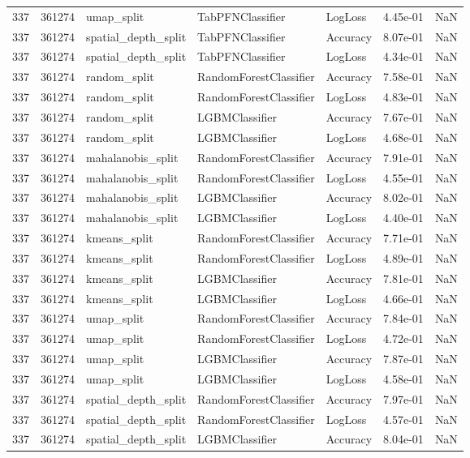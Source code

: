 \begin{tabular}{rrlllrr}
337 & 361274 & umap\_split & TabPFNClassifier & LogLoss & 4.45e-01 & NaN \\
337 & 361274 & spatial\_depth\_split & TabPFNClassifier & Accuracy & 8.07e-01 & NaN \\
337 & 361274 & spatial\_depth\_split & TabPFNClassifier & LogLoss & 4.34e-01 & NaN \\
337 & 361274 & random\_split & RandomForestClassifier & Accuracy & 7.58e-01 & NaN \\
337 & 361274 & random\_split & RandomForestClassifier & LogLoss & 4.83e-01 & NaN \\
337 & 361274 & random\_split & LGBMClassifier & Accuracy & 7.67e-01 & NaN \\
337 & 361274 & random\_split & LGBMClassifier & LogLoss & 4.68e-01 & NaN \\
337 & 361274 & mahalanobis\_split & RandomForestClassifier & Accuracy & 7.91e-01 & NaN \\
337 & 361274 & mahalanobis\_split & RandomForestClassifier & LogLoss & 4.55e-01 & NaN \\
337 & 361274 & mahalanobis\_split & LGBMClassifier & Accuracy & 8.02e-01 & NaN \\
337 & 361274 & mahalanobis\_split & LGBMClassifier & LogLoss & 4.40e-01 & NaN \\
337 & 361274 & kmeans\_split & RandomForestClassifier & Accuracy & 7.71e-01 & NaN \\
337 & 361274 & kmeans\_split & RandomForestClassifier & LogLoss & 4.89e-01 & NaN \\
337 & 361274 & kmeans\_split & LGBMClassifier & Accuracy & 7.81e-01 & NaN \\
337 & 361274 & kmeans\_split & LGBMClassifier & LogLoss & 4.66e-01 & NaN \\
337 & 361274 & umap\_split & RandomForestClassifier & Accuracy & 7.84e-01 & NaN \\
337 & 361274 & umap\_split & RandomForestClassifier & LogLoss & 4.72e-01 & NaN \\
337 & 361274 & umap\_split & LGBMClassifier & Accuracy & 7.87e-01 & NaN \\
337 & 361274 & umap\_split & LGBMClassifier & LogLoss & 4.58e-01 & NaN \\
337 & 361274 & spatial\_depth\_split & RandomForestClassifier & Accuracy & 7.97e-01 & NaN \\
337 & 361274 & spatial\_depth\_split & RandomForestClassifier & LogLoss & 4.57e-01 & NaN \\
337 & 361274 & spatial\_depth\_split & LGBMClassifier & Accuracy & 8.04e-01 & NaN \\

\end{tabular}
